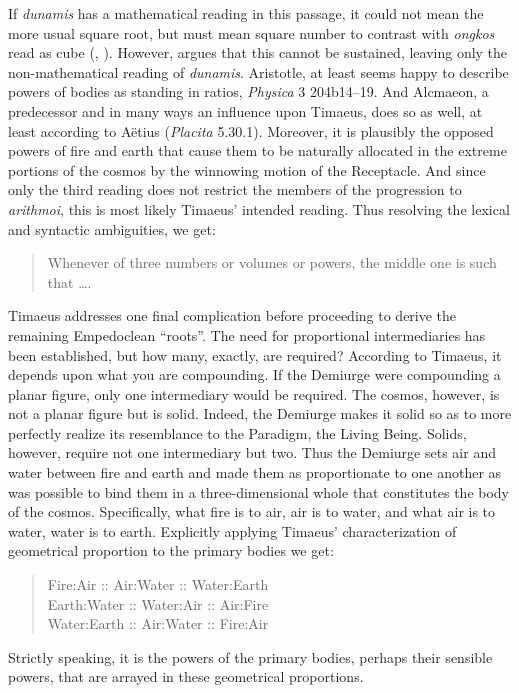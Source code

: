 If \emph{dunamis} has a mathematical reading in this passage, it could not mean the more usual square root, but must mean square number to contrast with \emph{ongkos} read as cube (\citealt[97 n12]{Archer-Hind:1888qd}, \citealt[45--52]{Cornford:1935fk}). However, \citet{Prtichard:1990aa} argues that this cannot be sustained, leaving only the non-mathematical reading of \emph{dunamis}. Aristotle, at least seems happy to describe powers of bodies as standing in ratios, \emph{Physica} 3 204b14--19. And Alcmaeon, a predecessor and in many ways an influence upon Timaeus, does so as well, at least according to Aëtius (\emph{Placita} 5.30.1). Moreover, it is plausibly the opposed powers of fire and earth that cause them to be naturally allocated in the extreme portions of the cosmos by the winnowing motion of the Receptacle. And since only the third reading does not restrict the members of the progression to \emph{arithmoi}, this is most likely Timaeus' intended reading. Thus resolving the lexical and syntactic ambiguities, we get:
\begin{quote}
	Whenever of three numbers or volumes or powers, the middle one is such that \dots.
\end{quote}

Timaeus addresses one final complication before proceeding to derive the remaining Empedoclean ``roots''. The need for proportional intermediaries has been established, but how many, exactly, are required? According to Timaeus, it depends upon what you are compounding. If the Demiurge were compounding a planar figure, only one intermediary would be required. The cosmos, however, is not a planar figure but is solid. Indeed, the Demiurge makes it solid so as to more perfectly realize its resemblance to the Paradigm, the Living Being. Solids, however, require not one intermediary but two. Thus the Demiurge sets air and water between fire and earth and made them as proportionate to one another as was possible to bind them in a three-dimensional whole that constitutes the body of the cosmos. Specifically, what fire is to air, air is to water, and what air is to water, water is to earth. Explicitly applying Timaeus' characterization of geometrical proportion to the primary bodies we get:
\begin{quote}
	Fire:Air :: Air:Water :: Water:Earth\\
	Earth:Water :: Water:Air :: Air:Fire\\
	Water:Earth :: Air:Water :: Fire:Air
\end{quote}
Strictly speaking, it is the powers of the primary bodies, perhaps their sensible powers, that are arrayed in these geometrical proportions. 

